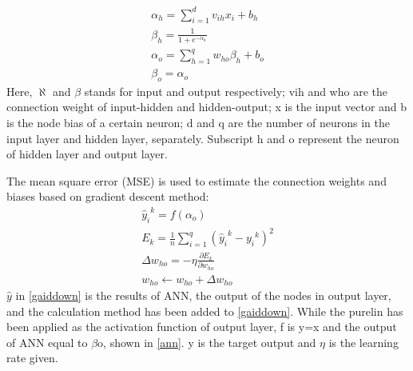 \documentclass[preprint,12pt]{elsarticle}
\begin{document}
\begin{equation}
	\begin{array}{l}
		{\alpha _h} = \sum\nolimits_{i = 1}^d {{v_{ih}}{x_i} + {b_h}} \\
		{\beta _h} = \frac{1}{{1 + {e^{ - {\alpha _h}}}}}\\
		{\alpha _o} = \sum\nolimits_{h = 1}^q {{w_{ho}}{\beta _h} + {b_o}} \\
		{\beta _o} = {\alpha _o}
	\end{array}\label{ann}
\end{equation}
Here, $\aleph$ and $\beta$ stands for input and output respectively; vih and who are the connection weight of input-hidden and hidden-output; x is the input vector and b is the node bias of a certain neuron; d and q are the number of neurons in the input layer and hidden layer, separately. Subscript h and o represent the neuron of hidden layer and output layer.

The mean square error (MSE) is used to estimate the connection weights and biases based on gradient descent method:
\begin{equation}
	\begin{array}{l}
		{\widehat y_i}^k = f({\alpha _o})\\
		{E_k} = \frac{1}{n}\sum\nolimits_{i = 1}^q {{{({{\widehat y}_i}^k - {y_i}^k)}^2}} \\
		\Delta {w_{ho}} =  - \eta \frac{{\partial {E_k}}}{{\partial {w_{ho}}}}\\
		{w_{ho}} \leftarrow {w_{ho}} + \Delta {w_{ho}}
	\end{array}\label{gaiddown}
\end{equation}
$\widehat y$ in \cref{gaiddown} is the results of ANN, the output of the nodes in output layer, and the calculation method has been added to \cref{gaiddown}. While the purelin has been applied as the activation function of output layer, f is y=x and the output of ANN equal to $\beta$o, shown in \cref{ann}. y is the target output and $\eta$ is the learning rate given.
\end{document}
